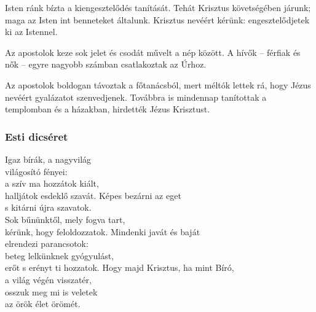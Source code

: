 \documentclass[twoside]{article}
\begin{document}
Isten ránk bízta a kiengesztelődés tanítását. Tehát Krisztus követségében járunk; maga az Isten int benneteket általunk. Krisztus nevéért kérünk: engesztelődjetek ki az Istennel.

Az apostolok keze sok jelet és csodát művelt a nép között. A hívők – férfiak és nők – egyre nagyobb számban csatlakoztak az Úrhoz.

Az apostolok boldogan távoztak a főtanácsból, mert méltók lettek rá, hogy Jézus nevéért gyalázatot szenvedjenek. Továbbra is mindennap tanítottak a templomban és a házakban, hirdették Jézus Krisztust.

\subsubsection*{Esti dicséret}

\begin{hymnstanzas}
    Igaz bírák, a nagyvilág\\
    világosító fényei:\\
    a szív ma hozzátok kiált,\\
    halljátok esdeklő szavát.
\stanzabreak
    Képes bezárni az eget\\
    s kitárni újra szavatok.\\
    Sok bűnünktől, mely fogva tart,\\
    kérünk, hogy feloldozzatok.
\stanzabreak
    Mindenki javát és baját\\
    elrendezi parancsotok:\\
    beteg lelkünknek gyógyulást,\\
    erőt s erényt ti hozzatok.
\stanzabreak
    Hogy majd Krisztus, ha mint Bíró,\\
    a világ végén visszatér,\\
    osszuk meg mi is veletek\\
    az örök élet örömét.
\end{hymnstanzas}
\end{document}
